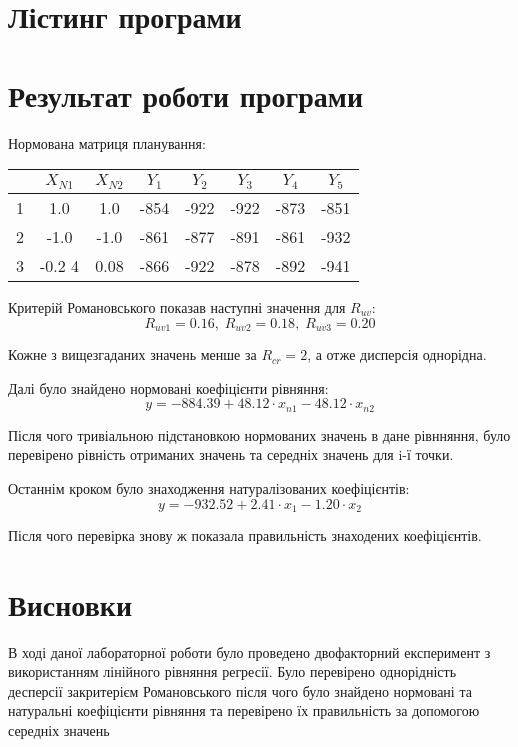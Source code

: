 \section{Лістинг програми}



\section{Результат роботи програми}

Нормована матриця планування:
\begin{center}
    \begin{tabular}{|c|c|c|c|c|c|c|c|}
        \hline
         & $X_{N1}$ & $X_{N2}$ & $Y_{1}$ & $Y_{2}$ & $Y_{3}$ & $Y_{4}$ & $Y_{5}$ \\ 
        \hline
        1 & 1.0 & 1.0 & -854 & -922 & -922 & -873 & -851 \\
        2 & -1.0 & -1.0 & -861 & -877 & -891 & -861 & -932 \\
        3 & -0.2 4 & 0.08 & -866 & -922 & -878 & -892 & -941 \\
        \hline
    \end{tabular}
\end{center}

Критерій Романовського показав наступні значення для $R_{uv}$:
\[R_{uv1}=0.16,\; R_{uv2}=0.18,\; R_{uv3}=0.20\]

Кожне з вищезгаданих значень менше за $R_{cr}=2$, а отже дисперсія однорідна.

Далі було знайдено нормовані коефіцієнти рівняння:
\[y = -884.39+48.12\cdot x_{n1}-48.12\cdot x_{n2}\]

Після чого тривіальною підстановкою нормованих значень в дане рівнняння, було 
перевірено рівність отриманих значень та середніх значень для i-ї точки.

Останнім кроком було знаходження натуралізованих коефіцієнтів:
\[y = -932.52+2.41\cdot x_{1}-1.20\cdot x_{2}\]

Після чого перевірка знову ж показала правильність знаходених коефіцієнтів.
\section{Висновки}
В ході даної лабораторної роботи було проведено двофакторний експеримент з 
використанням лінійного рівняння регресії. Було перевірено однорідність десперсії
закритерієм Романовського після чого було знайдено нормовані та натуральні коефіцієнти
рівняння та перевірено їх правильність за допомогою середніх значень